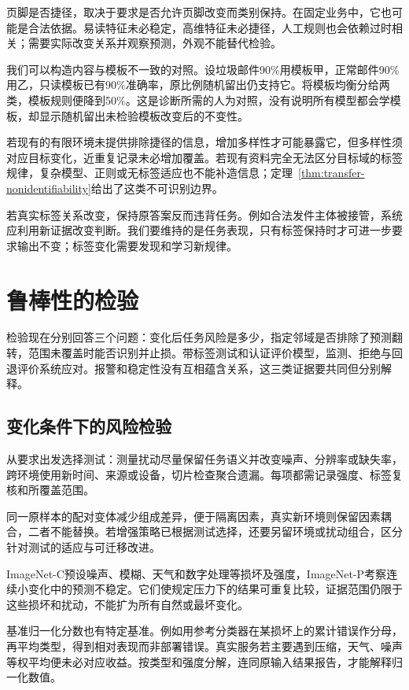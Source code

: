 页脚是否捷径，取决于要求是否允许页脚改变而类别保持。在固定业务中，它也可能是合法依据。易读特征未必稳定，高维特征未必捷径，人工规则也会依赖过时相关；需要实际改变关系并观察预测，外观不能替代检验。

我们可以构造内容与模板不一致的对照。设垃圾邮件90\%用模板甲，正常邮件90\%用乙，只读模板已有90\%准确率，原比例随机留出仍支持它。将模板均衡分给两类，模板规则便降到50\%。这是诊断所需的人为对照，没有说明所有模型都会学模板，却显示随机留出未检验模板改变后的不变性。

若现有的有限环境未提供排除捷径的信息，增加多样性才可能暴露它，但多样性须对应目标变化，近重复记录未必增加覆盖。若现有资料完全无法区分目标域的标签规律，复杂模型、正则或无标签适应也不能补造信息；定理~\ref{thm:transfer-nonidentifiability}给出了这类不可识别边界。

若真实标签关系改变，保持原答案反而违背任务。例如合法发件主体被接管，系统应利用新证据改变判断。我们要维持的是任务表现，只有标签保持时才可进一步要求输出不变；标签变化需要发现和学习新规律。

\section{鲁棒性的检验}
\label{sec:robustness-evaluation}

检验现在分别回答三个问题：变化后任务风险是多少，指定邻域是否排除了预测翻转，范围未覆盖时能否识别并止损。带标签测试和认证评价模型，监测、拒绝与回退评价系统应对。报警和稳定性没有互相蕴含关系，这三类证据要共同但分别解释。

\subsection{变化条件下的风险检验}
\label{sec:robustness-risk-test}

从要求出发选择测试：测量扰动尽量保留任务语义并改变噪声、分辨率或缺失率，跨环境使用新时间、来源或设备，切片检查聚合遗漏。每项都需记录强度、标签复核和所覆盖范围。

同一原样本的配对变体减少组成差异，便于隔离因素，真实新环境则保留因素耦合，二者不能替换。若增强策略已根据测试选择，还要另留环境或扰动组合，区分针对测试的适应与可迁移改进。

ImageNet-C预设噪声、模糊、天气和数字处理等损坏及强度，ImageNet-P考察连续小变化中的预测不稳定。它们使规定压力下的结果可重复比较，证据范围仍限于这些损坏和扰动，不能扩为所有自然或最坏变化。

基准归一化分数也有特定基准。例如用参考分类器在某损坏上的累计错误作分母，再平均类型，得到相对表现而非部署错误。真实服务若主要遇到压缩，天气、噪声等权平均便未必对应收益。按类型和强度分解，连同原输入结果报告，才能解释归一化数值。

